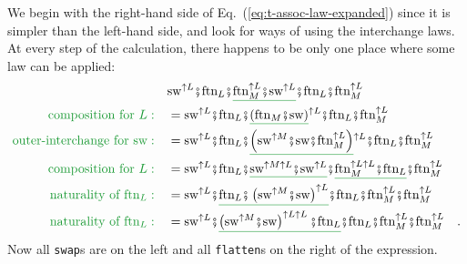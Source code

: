 We begin with the right-hand side of Eq.~(\ref{eq:t-assoc-law-expanded})
since it is simpler than the left-hand side, and look for ways of
using the interchange laws. At every step of the calculation, there
happens to be only one place where some law can be applied:
\begin{align*}
 & \text{sw}^{\uparrow L}\bef\text{ftn}_{L}\bef\gunderline{\text{ftn}_{M}^{\uparrow L}\bef\text{sw}^{\uparrow L}}\bef\text{ftn}_{L}\bef\text{ftn}_{M}^{\uparrow L}\\
{\color{greenunder}\text{composition for }L:}\quad & =\text{sw}^{\uparrow L}\bef\text{ftn}_{L}\bef\gunderline{\left(\text{ftn}_{M}\bef\text{sw}\right)}^{\uparrow L}\bef\text{ftn}_{L}\bef\text{ftn}_{M}^{\uparrow L}\\
{\color{greenunder}\text{outer-interchange for }\text{sw}:}\quad & =\text{sw}^{\uparrow L}\bef\text{ftn}_{L}\bef\gunderline{\left(\text{sw}^{\uparrow M}\bef\text{sw}\bef\text{ftn}_{M}^{\uparrow L}\right)}^{\uparrow L}\bef\text{ftn}_{L}\bef\text{ftn}_{M}^{\uparrow L}\\
{\color{greenunder}\text{composition for }L:}\quad & =\text{sw}^{\uparrow L}\bef\text{ftn}_{L}\bef\gunderline{\text{sw}^{\uparrow M\uparrow L}\bef\text{sw}^{\uparrow L}}\bef\gunderline{\text{ftn}_{M}^{\uparrow L\uparrow L}\bef\text{ftn}_{L}}\bef\text{ftn}_{M}^{\uparrow L}\\
{\color{greenunder}\text{naturality of }\text{ftn}_{L}:}\quad & =\text{sw}^{\uparrow L}\bef\gunderline{\text{ftn}_{L}\bef\left(\text{sw}^{\uparrow M}\bef\text{sw}\right)^{\uparrow L}}\bef\text{ftn}_{L}\bef\text{ftn}_{M}^{\uparrow L}\bef\text{ftn}_{M}^{\uparrow L}\\
{\color{greenunder}\text{naturality of }\text{ftn}_{L}:}\quad & =\text{sw}^{\uparrow L}\bef\gunderline{\left(\text{sw}^{\uparrow M}\bef\text{sw}\right)^{\uparrow L\uparrow L}\bef\text{ftn}_{L}}\bef\text{ftn}_{L}\bef\text{ftn}_{M}^{\uparrow L}\bef\text{ftn}_{M}^{\uparrow L}\quad.
\end{align*}
Now all \lstinline!swap!s
are on the left and all \lstinline!flatten!s
on the right of the expression.

